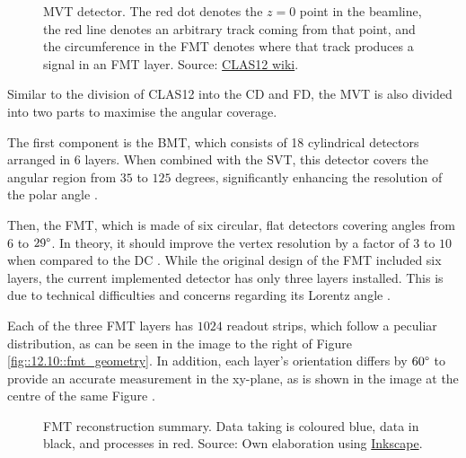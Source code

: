     \begin{figure}[b!]
        \centering{}
        \caption[MVT detector.]{MVT detector.
        The red dot denotes the $z=0$ point in the beamline, the red line denotes an arbitrary track coming from that point, and the circumference in the FMT denotes where that track produces a signal in an FMT layer.
        Source: \hyperlink{jlab.org/physics/hall-b/clas12}{CLAS12 wiki}.}
        \label{fig::12.10::micromegas_vertex_tracker}
    \end{figure}

    Similar to the division of CLAS12 into the CD and FD, the MVT is also divided into two parts to maximise the angular coverage.

    The first component is the BMT, which consists of 18 cylindrical detectors arranged in 6 layers.
    When combined with the SVT, this detector covers the angular region from $35$ to $125$ degrees, significantly enhancing the resolution of the polar angle \cite{acker2020mvt}.

    Then, the FMT, which is made of six circular, flat detectors covering angles from $6$ to $29\degree$.
    In theory, it should improve the vertex resolution by a factor of $3$ to $10$ when compared to the DC \cite{aune2009}.
    While the original design of the FMT included six layers, the current implemented detector has only three layers installed.
    This is due to technical difficulties and concerns regarding its Lorentz angle \cite{konczykowski2010}.

    Each of the three FMT layers has $1024$ readout strips, which follow a peculiar distribution, as can be seen in the image to the right of Figure \ref{fig::12.10::fmt_geometry}.
    In addition, each layer's orientation differs by $60\degree$ to provide an accurate measurement in the xy-plane, as is shown in the image at the centre of the same Figure \cite{acker2020mvt}.

    \begin{wrapfigure}{r}{0.50\textwidth}
        \centering{}
        \caption[FMT reconstruction summary]{FMT reconstruction summary.
        Data taking is coloured blue, data in black, and processes in red.
        Source: Own elaboration using \hyperlink{inkscape.org/}{Inkscape}.}
        \label{fig::12.11::fmt_reconstruction}
    \end{wrapfigure}

